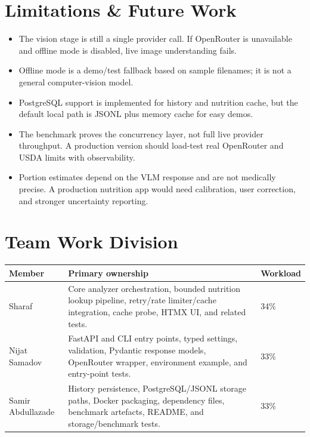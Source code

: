 \documentclass[11pt,a4paper]{article}
\begin{document}
\section{Limitations \& Future Work}\label{sec:limits}

\begin{itemize}[itemsep=3pt]
  \item The vision stage is still a single provider call. If OpenRouter is unavailable and offline mode is disabled, live image understanding fails.
  \item Offline mode is a demo/test fallback based on sample filenames; it is not a general computer-vision model.
  \item PostgreSQL support is implemented for history and nutrition cache, but the default local path is JSONL plus memory cache for easy demos.
  \item The benchmark proves the concurrency layer, not full live provider throughput. A production version should load-test real OpenRouter and USDA limits with observability.
  \item Portion estimates depend on the VLM response and are not medically precise. A production nutrition app would need calibration, user correction, and stronger uncertainty reporting.
\end{itemize}

\section{Team Work Division}\label{sec:contributions}

\begin{center}\small
\begin{tabularx}{\textwidth}{lXl}
\toprule
\textbf{Member} & \textbf{Primary ownership} & \textbf{Workload} \\
\midrule
Sharaf & Core analyzer orchestration, bounded nutrition lookup pipeline, retry/rate limiter/cache integration, cache probe, HTMX UI, and related tests. & 34\% \\
Nijat Samadov & FastAPI and CLI entry points, typed settings, validation, Pydantic response models, OpenRouter wrapper, environment example, and entry-point tests. & 33\% \\
Samir Abdullazade & History persistence, PostgreSQL/JSONL storage paths, Docker packaging, dependency files, benchmark artefacts, README, and storage/benchmark tests. & 33\% \\
\bottomrule
\end{tabularx}
\end{center}
\end{document}
